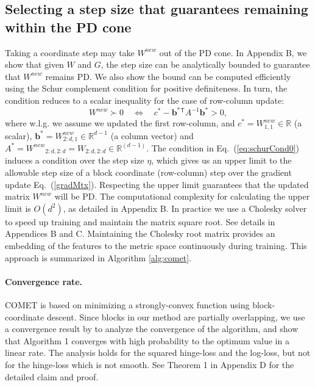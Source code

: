 \documentclass[twoside,11pt]{article}
\newcommand\mat[1]{{#1}}
\renewcommand\vec[1]{\mathbf{#1}}
\newcommand{\T}{{}^\mathsf{T}}
\newcommand{\W}{\mat{W}}
\newcommand{\newW}{{\mat{W^{new}}}}
\newcommand{\R}{\mathbb{R}}
\newcommand{\cholL}{\mat{L}}
\newcommand{\B}{\vec{b}}
\newcommand{\C}{c}
\newcommand{\invA}{A^{-1}}
\newcommand{\Wvec}{\W_{2:d,1}}
\newcommand{\Wscalar}{\W_{1,1}}
\renewcommand{\eqref}[1]{Eq.~(\ref{#1})}
\begin{document}
\subsection{Selecting a step size that guarantees remaining within the PD cone}\label{subsec:step} \vskip -4pt
Taking a coordinate step may take $\newW$ out of the PD cone. In Appendix B, we show that given $\W$ and $\mat{G}$, the step size can be analytically bounded to guarantee that $\newW$ remains PD. We also show the bound can be computed efficiently using the Schur complement condition for positive definiteness. In turn, the condition reduces to a scalar inequality for the case of row-column update:
\begin{equation}\label{eq:schurCond0}
  \newW \succ  0 \quad \Leftrightarrow \quad  \C^* - \B^*\T \invA \B^* >  0,
\end{equation}
where w.l.g. we assume we updated the first row-column, and $\C^* = \Wscalar^{new} \in \R$ (a scalar), $\B^* = \Wvec^{new} \in \R^{d-1}$ (a column vector) and $A^* = \newW_{2:d,2:d} = \W_{2:d,2:d}\in \R^{(d-1)}$. The condition in \eqref{eq:schurCond0} induces a condition over the step size $\eta$, which gives us an upper limit to the allowable step size of a block coordinate (row-column) step over the gradient update \eqref{gradMtx}. Respecting the upper limit guarantees that the updated matrix $\W^{new}$ will be PD. The computational complexity for calculating the upper limit is $O(d^2)$, as  detailed in Appendix B. In practice we use a Cholesky solver \citep{CHOLMOD} to speed up training and maintain the matrix square root. See details in Appendices B and C.
Maintaining the Cholesky root matrix provides an embedding of the features to the metric space continuously during  training. This approach is summarized in Algorithm \ref{alg:comet}.
\vskip -5pt
\paragraph{Convergence rate.}
COMET is based on minimizing a strongly-convex function using block-coordinate descent. Since blocks in our method are partially overlapping, we use a convergence result by \citet{richtarik2013optimal} to analyze the convergence of the algorithm, and show that Algorithm 1 converges with high probability to the optimum value in a linear rate. The analysis holds for the squared hinge-loss and the log-loss, but not for the hinge-loss which is not smooth. See Theorem 1 in Appendix D for the detailed claim and proof.
\end{document}
